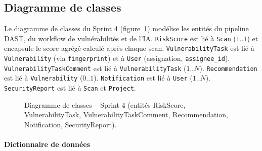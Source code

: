 \subsection{Diagramme de classes}

Le diagramme de classes du Sprint 4 (figure~\ref{fig:sprint4-class}) modélise les entités du pipeline DAST, du workflow de vulnérabilités et de l'IA. \texttt{RiskScore} est lié à \texttt{Scan} (\(1..1\)) et encapsule le score agrégé calculé après chaque scan. \texttt{VulnerabilityTask} est lié à \texttt{Vulnerability} (via \texttt{fingerprint}) et à \texttt{User} (assignation, \texttt{assignee\_id}). \texttt{VulnerabilityTaskComment} est lié à \texttt{VulnerabilityTask} (\(1..N\)). \texttt{Recommendation} est lié à \texttt{Vulnerability} (\(0..1\)). \texttt{Notification} est lié à \texttt{User} (\(1..N\)). \texttt{SecurityReport} est lié à \texttt{Scan} et \texttt{Project}.

\begin{figure}[H]
\centering
\fbox{\rule{0pt}{2in}\rule{0.9\linewidth}{0pt}}
\caption{Diagramme de classes -- Sprint 4 (entités RiskScore, VulnerabilityTask, VulnerabilityTaskComment, Recommendation, Notification, SecurityReport).}
\label{fig:sprint4-class}
\end{figure}

\paragraph{Dictionnaire de données}

